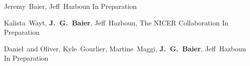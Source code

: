          {Jeremy~{{Baier}, Jeff}~{Hazboun}}
         {}
         {In Preparation}

         {Kalista~{Wayt}, \textbf{J.~G.~{Baier}}, Jeff~{Hazboun}, {The NICER Collaboration}}
         {}
         {In Preparation}

         {Daniel~and {Oliver}, Kyle~{Gourlier}, Martine~{Maggi}, \textbf{J.~G.~{Baier}}, Jeff~{Hazboun}}
         {}
         {In Preparation}

